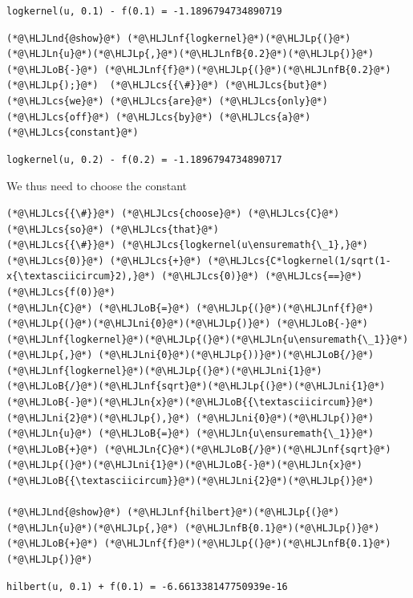 \documentclass[12pt,a4paper]{article}
\newcommand{\HLJLn}[1]{#1}
\newcommand{\HLJLnd}[1]{\textcolor[RGB]{214,102,97}{#1}}
\newcommand{\HLJLnf}[1]{\textcolor[RGB]{66,102,213}{#1}}
\newcommand{\HLJLnfB}[1]{\textcolor[RGB]{59,151,46}{#1}}
\newcommand{\HLJLni}[1]{\textcolor[RGB]{59,151,46}{#1}}
\newcommand{\HLJLoB}[1]{\textcolor[RGB]{102,102,102}{\textbf{#1}}}
\newcommand{\HLJLp}[1]{#1}
\newcommand{\HLJLcs}[1]{\textcolor[RGB]{153,153,119}{\textit{#1}}}
\begin{document}
\begin{lstlisting}
logkernel(u, 0.1) - f(0.1) = -1.1896794734890719
\end{lstlisting}


\begin{lstlisting}
(*@\HLJLnd{@show}@*) (*@\HLJLnf{logkernel}@*)(*@\HLJLp{(}@*)(*@\HLJLn{u}@*)(*@\HLJLp{,}@*)(*@\HLJLnfB{0.2}@*)(*@\HLJLp{)}@*) (*@\HLJLoB{-}@*) (*@\HLJLnf{f}@*)(*@\HLJLp{(}@*)(*@\HLJLnfB{0.2}@*)(*@\HLJLp{);}@*)  (*@\HLJLcs{{\#}}@*) (*@\HLJLcs{but}@*) (*@\HLJLcs{we}@*) (*@\HLJLcs{are}@*) (*@\HLJLcs{only}@*) (*@\HLJLcs{off}@*) (*@\HLJLcs{by}@*) (*@\HLJLcs{a}@*) (*@\HLJLcs{constant}@*)
\end{lstlisting}

\begin{lstlisting}
logkernel(u, 0.2) - f(0.2) = -1.1896794734890717
\end{lstlisting}


We thus need to choose the constant


\begin{lstlisting}
(*@\HLJLcs{{\#}}@*) (*@\HLJLcs{choose}@*) (*@\HLJLcs{C}@*) (*@\HLJLcs{so}@*) (*@\HLJLcs{that}@*)
(*@\HLJLcs{{\#}}@*) (*@\HLJLcs{logkernel(u\ensuremath{\_1},}@*) (*@\HLJLcs{0)}@*) (*@\HLJLcs{+}@*) (*@\HLJLcs{C*logkernel(1/sqrt(1-x{\textasciicircum}2),}@*) (*@\HLJLcs{0)}@*) (*@\HLJLcs{==}@*) (*@\HLJLcs{f(0)}@*)
(*@\HLJLn{C}@*) (*@\HLJLoB{=}@*) (*@\HLJLp{(}@*)(*@\HLJLnf{f}@*)(*@\HLJLp{(}@*)(*@\HLJLni{0}@*)(*@\HLJLp{)}@*) (*@\HLJLoB{-}@*) (*@\HLJLnf{logkernel}@*)(*@\HLJLp{(}@*)(*@\HLJLn{u\ensuremath{\_1}}@*)(*@\HLJLp{,}@*) (*@\HLJLni{0}@*)(*@\HLJLp{))}@*)(*@\HLJLoB{/}@*)(*@\HLJLnf{logkernel}@*)(*@\HLJLp{(}@*)(*@\HLJLni{1}@*)(*@\HLJLoB{/}@*)(*@\HLJLnf{sqrt}@*)(*@\HLJLp{(}@*)(*@\HLJLni{1}@*)(*@\HLJLoB{-}@*)(*@\HLJLn{x}@*)(*@\HLJLoB{{\textasciicircum}}@*)(*@\HLJLni{2}@*)(*@\HLJLp{),}@*) (*@\HLJLni{0}@*)(*@\HLJLp{)}@*)
(*@\HLJLn{u}@*) (*@\HLJLoB{=}@*) (*@\HLJLn{u\ensuremath{\_1}}@*) (*@\HLJLoB{+}@*) (*@\HLJLn{C}@*)(*@\HLJLoB{/}@*)(*@\HLJLnf{sqrt}@*)(*@\HLJLp{(}@*)(*@\HLJLni{1}@*)(*@\HLJLoB{-}@*)(*@\HLJLn{x}@*)(*@\HLJLoB{{\textasciicircum}}@*)(*@\HLJLni{2}@*)(*@\HLJLp{)}@*)

(*@\HLJLnd{@show}@*) (*@\HLJLnf{hilbert}@*)(*@\HLJLp{(}@*)(*@\HLJLn{u}@*)(*@\HLJLp{,}@*) (*@\HLJLnfB{0.1}@*)(*@\HLJLp{)}@*) (*@\HLJLoB{+}@*) (*@\HLJLnf{f}@*)(*@\HLJLp{(}@*)(*@\HLJLnfB{0.1}@*)(*@\HLJLp{)}@*)
\end{lstlisting}

\begin{lstlisting}
hilbert(u, 0.1) + f(0.1) = -6.661338147750939e-16
\end{lstlisting}
\end{document}
